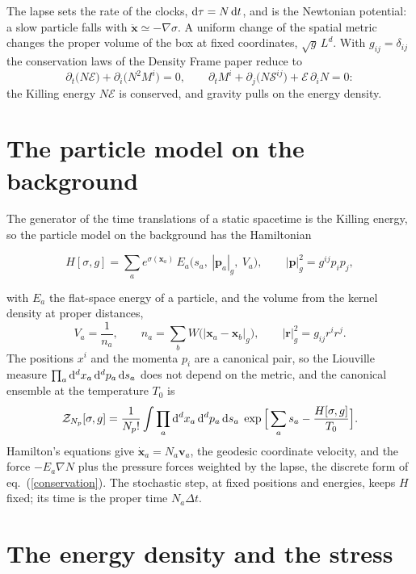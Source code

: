 \documentclass[11pt,aps,preprint,nofootinbib,superscriptaddress,tightenlines]{revtex4-2}
\def\edense{{\mathcal{E}}}
\def\pdense{M}
\def\Sstress{{\mathcal S}}
\def\dd{{\rm d}}
\def\st{\begin{equation}}
\def\stp{\end{equation}}
\def\Eq#1{eq.~(\ref{#1})}
\begin{document}
The lapse sets the rate of the clocks, $\dd\tau=N\,\dd t$, and is the Newtonian potential: a slow particle falls with $\ddot{\bm x}\simeq-\nabla\sigma$.  A uniform change of
the spatial metric changes the proper volume of the box at fixed coordinates, $\sqrt g\,L^d$.  With $g_{ij}=\delta_{ij}$ the conservation laws of the Density Frame
paper reduce to
\st
\partial_t\big(N\edense\big)+\partial_i\big(N^2\pdense^i\big)=0,\qquad
\partial_t\pdense^i+\partial_j\big(N\Sstress^{ij}\big)+\edense\,\partial_iN=0 :
\label{conservation}
\stp
the Killing energy $N\edense$ is conserved, and gravity pulls on the energy density.

\section{The particle model on the background}
\label{sec:model}

The generator of the time translations of a static spacetime is the Killing energy, so the particle model on the background has the Hamiltonian
\begin{keyeq}
\st
H[\sigma,g]=\sum_ae^{\sigma(\bm x_a)}\,E_a\big(s_a,\ |\bm p_a|_g,\ V_a\big),\qquad |\bm p|_g^2=g^{ij}p_ip_j ,
\label{H}
\stp
\end{keyeq}
with $E_a$ the flat-space energy of a particle, and the volume from the kernel density at proper distances,
\st
V_a=\frac1{n_a},\qquad n_a=\sum_bW\big(|\bm x_a-\bm x_b|_g\big),\qquad |\bm r|_g^2=g_{ij}r^ir^j .
\stp
The positions $x^i$ and the momenta $p_i$ are a canonical pair, so the Liouville measure $\prod_a\dd^dx_a\,\dd^dp_a\,\dd s_a$ does not depend on the metric, and the
canonical ensemble at the temperature $T_0$ is
\st
\mathcal Z_{N_p}[\sigma,g]=\frac1{N_p!}\int\prod_a\dd^dx_a\,\dd^dp_a\,\dd s_a\;\exp\Big[\sum_as_a-\frac{H[\sigma,g]}{T_0}\Big] .
\label{Z}
\stp
Hamilton's equations give $\dot{\bm x}_a=N_a\bm v_a$, the geodesic coordinate velocity, and the force $-E_a\nabla N$ plus the pressure forces weighted by the lapse, the
discrete form of \Eq{conservation}.  The stochastic step, at fixed positions and energies, keeps $H$ fixed; its time is the proper time $N_a\Delta t$.

\section{The energy density and the stress}
\label{sec:defs}
\end{document}
